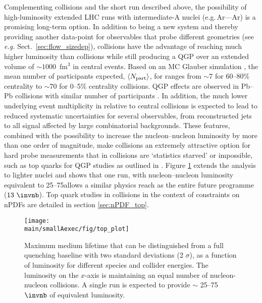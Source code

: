 Complementing \PbPb collisions and the short \OO run described above, 
the possibility of high-luminosity extended LHC runs with intermediate-A nuclei (e.g.\,Ar—Ar)
is a promising long-term option.
In addition to being a new system and thereby providing another data-point for observables that probe different geometries (see \textit{e.g.} Sect.~\ref{sec:flow_sizedep}), \ArAr collisions have the advantage of reaching much higher luminosity than \PbPb collisions while still producing a QGP over an extended volume of $\sim 1000$~fm$^3$ in central events. Based on an MC Glauber simulation \cite{Miller:2007ri}, the mean number of participants expected, $\langle N_{\rm part}\rangle$, for \ArAr ranges from  $\sim 7$ for 60--80\% centrality to $\sim 70$ for 0--5\% centrality collisions.  
QGP effects are observed in Pb--Pb collisions with similar number of participants \cite{Sirunyan:2018eqi, ATLAS-CONF-2018-007}.  In addition, the much lower underlying event multiplicity in \ArAr relative to central \PbPb collisions is expected to lead to reduced  systematic uncertainties for several observables, from reconstructed jets to all signal affected by large combinatorial backgrounds.  These features, combined with the possibility to increase the nucleon--nucleon luminosity by more than one order of magnitude, make \ArAr collisions an extremely attractive option for hard probe measurements that in \PbPb collisions are `statistics starved' or impossible, such as top quarks for QGP studies as outlined in \cite{Apolinario:2017sob}.  Figure \ref{fig:boosted_tops} extends the analysis to lighter nuclei and shows that one \ArAr run, with nucleon--nucleon luminosity equivalent to 25--75allows a similar physics reach as the entire \PbPb future programme ($13~\invnb$).  Top quark studies in \ArAr collisions in the context of constraints on nPDFs are detailed in section \ref{sec:nPDF_top}.
\begin{figure}
\centering
\texttt{[image: \\main/smallAexec/fig/top\_plot]}
\caption{Maximum medium lifetime that can be distinguished from a full quenching baseline with two standard deviations (2 $\sigma$), as a function of luminosity for different species and collider energies. The luminosity on the $x$-axis is maintaining an equal number of nucleon-nucleon collisions. A single \ArAr run is expected to provide $\sim$ 25--75 $\invnb$ of \PbPb equivalent luminosity.}
\label{fig:boosted_tops}
\end{figure}

